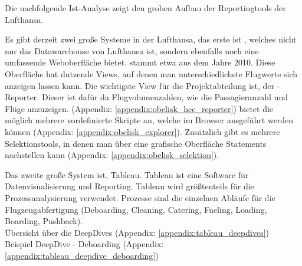 		{

			\noindent
			Die nachfolgende Ist-Analyse zeigt den groben Aufbau der Reportingtools der Lufthansa.
		}
		{
			 \noindent
			 Es gibt derzeit zwei große Systeme in der Lufthansa, das erste ist , welches nicht nur das Datawarehouse von Lufthansa ist, sondern ebenfalls noch eine umfassende Weboberfläche bietet.  stammt etwa aus dem Jahre 2010.
			Diese Oberfläche hat dutzende Views, auf denen man unterschiedlichste Flugwerte sich anzeigen lassen kann. Die wichtigste View für die Projektabteilung ist, der -Reporter. Dieser ist dafür da Flugvolumenzahlen, wie die Passagieranzahl und Flüge anzuzeigen.
			(Appendix: \ref{appendix:obelisk_hcc_reporter})
			 bietet die möglich mehrere vordefinierte  Skripte an, welche im Browser ausgeführt werden können (Appendix: \ref{appendix:obelisk_explorer}).
			Zusätzlich gibt es mehrere Selektionstools, in denen man über eine grafische Oberfläche  Statements nachstellen kann (Appendix: \ref{appendix:obelisk_selektion}).
		}

		{
			\noindent
			Das zweite große System ist, Tableau. Tableau ist eine Software für Datenvisualisierung und Reporting. Tableau wird größtenteils für die Prozessanalysierung verwendet. Prozesse sind die einzelnen Abläufe für die Flugzeugabfertigung (Deboarding, Cleaning, Catering, Fueling, Loading, Boarding, Pushback).\\

		}
		{
			\noindent
			Übersicht über die DeepDives (Appendix: \ref{appendix:tableau_deepdives})\\
			Beispiel DeepDive - Deboarding (Appendix: \ref{appendix:tableau_deepdive_deboarding})
		}